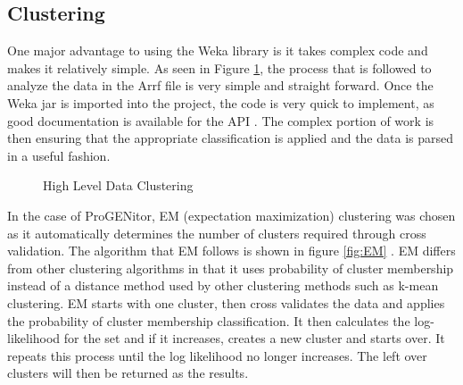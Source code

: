 \subsection{Clustering}
One major advantage to using the Weka library is it takes complex code and makes
it relatively simple.  As seen in Figure \ref{fig:clustering}, the process that is
followed to analyze the data in the Arrf file is very simple and straight
forward.  Once the Weka jar is imported into the project, the code is very quick
to implement, as good documentation is available for the API \cite{weka}.  The
complex portion of work is then ensuring that the appropriate classification is
applied and the data is parsed in a useful fashion.


\usetikzlibrary{shapes,arrows,chains}

\begin{figure}[H]
	\centering
	\caption{High Level Data Clustering}
	\label{fig:clustering}
\end{figure}

In the case of ProGENitor, EM (expectation maximization) clustering was chosen
as it automatically determines the number of clusters required through cross
validation.  The algorithm that EM follows is shown in figure
\ref{fig:EM} \cite{EM}.  EM differs from other clustering algorithms in that it
uses probability of cluster membership instead of a distance method used by
other clustering methods such as k-mean clustering.  EM starts with one cluster,
then cross validates the data and applies the probability of cluster membership
classification.  It then calculates the log-likelihood for the set and if it
increases, creates a new cluster and starts over.  It repeats this process until
the log likelihood no longer increases.  The left over clusters will then be
returned as the results.

